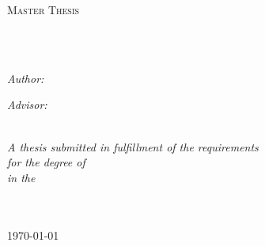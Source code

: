 \documentclass[
12pt, %
english, %
doublespacing, %
headsepline, %
]{MastersDoctoralThesis} %
\author{Ori \textsc{Tal}} %
\begin{document}
\frontmatter %

\pagestyle{plain} %


\begin{titlepage}
\begin{center}

\vspace*{.06\textheight}
{\scshape\LARGE \univname\par}\vspace{0.5cm} %
\textsc{\Large Master Thesis}\\[0.1cm] %

\HRule \\[0.1cm] %
{\huge \bfseries \ttitle\par}\vspace{0.1cm} %
\HRule \\[0.1cm] %
 
\begin{minipage}[t]{0.4\textwidth}
\begin{flushleft} \large
\emph{Author:}\\
\href{http://www.johnsmith.com}{\authorname} %
\end{flushleft}
\end{minipage}
\begin{minipage}[t]{0.4\textwidth}
\begin{flushright} \large
\emph{Advisor:} \\
\href{http://www.jamessmith.com}{\supname} %
\end{flushright}
\end{minipage}\\[1cm]


\large \textit{A thesis submitted in fulfillment of the requirements\\ for the degree of \degreename}\\[0.3cm] %
\textit{in the}\\[0.4cm]
\groupname\\\deptname\\[2cm] %
 
\vfill

{\large \today}\\[4cm] %
 
\vfill
\end{center}
\end{titlepage}
\end{document}
